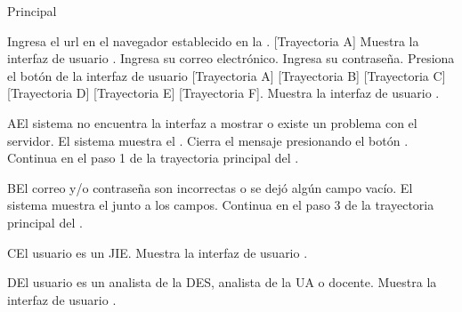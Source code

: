 \begin{UCtrayectoria}{Principal}
    
    \UCpaso[\UCactor] Ingresa el url en el navegador establecido en la . [Trayectoria A] 
    \UCpaso Muestra la interfaz de usuario .
    \UCpaso[\UCactor] Ingresa su correo electrónico.
    \UCpaso[\UCactor] Ingresa su contraseña.
    \UCpaso[\UCactor] Presiona el botón  de la interfaz de usuario [Trayectoria A] [Trayectoria B] [Trayectoria C] [Trayectoria D] [Trayectoria E] [Trayectoria F].
    \UCpaso Muestra la interfaz de usuario .
\end{UCtrayectoria}


\begin{UCtrayectoriaA}{A}{El sistema no encuentra la interfaz a mostrar o existe un problema con el servidor.}
    \UCpaso El sistema muestra el .
    \UCpaso[\UCactor] Cierra el mensaje presionando el botón .
    \UCpaso Continua en el paso 1 de la trayectoria principal del .
\end{UCtrayectoriaA}


\begin{UCtrayectoriaA}{B}{El correo y/o contraseña son incorrectas o se dejó algún campo vacío.}
    \UCpaso El sistema muestra el  junto a los campos.
    \UCpaso Continua en el paso 3 de la trayectoria principal del .
\end{UCtrayectoriaA}


\begin{UCtrayectoriaA}{C}{El usuario es un JIE.}
    \UCpaso Muestra la interfaz de usuario .
\end{UCtrayectoriaA}


\begin{UCtrayectoriaA}{D}{El usuario es un analista de la DES, analista de la UA o docente.}
    \UCpaso Muestra la interfaz de usuario .
\end{UCtrayectoriaA}

